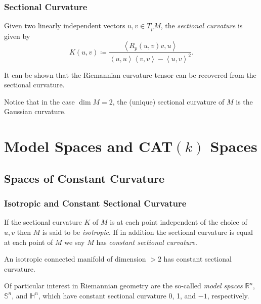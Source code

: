 \documentclass[handout]{beamer}
\newcommand{\Sp}{\mathbb{S}}
\newcommand{\Hy}{\mathbb{H}}
\newcommand{\R}{\mathbb{R}}
\newcommand{\inprod}[2]{\left\langle #1, #2 \right\rangle}
\theoremstyle{definition}
\begin{document}
\begin{frame}
    \frametitle{Sectional Curvature}

    \pause
    \begin{definition}
        Given two linearly independent vectors $u, v \in T_pM$, the \emph{sectional curvature}
        is given by
        \[
            K(u,v) \coloneqq \frac{\inprod{R_p(u,v)v}{u}}{\inprod{u}{u}\inprod{v}{v} - \inprod{u}{v}^2}.
        \]
    \end{definition}

    \pause
    It can be shown that the Riemannian curvature tensor can be recovered from the
    sectional curvature.

    \pause
    Notice that in the case $\dim M = 2$, the (unique) sectional curvature of $M$ is the
    Gaussian curvature.

\end{frame}

\section{Model Spaces and CAT$(k)$ Spaces}

\subsection{Spaces of Constant Curvature}

\begin{frame}
    \frametitle{Isotropic and Constant Sectional Curvature}

    \pause
    \begin{definition}
        If the sectional curvature $K$ of $M$ is at each point independent of the
        choice of $u,v$ then $M$ is said to be \emph{isotropic}. If in addition
        the sectional curvature is equal at each point of $M$ we say $M$ has
        \emph{constant sectional curvature}.
    \end{definition}

    \pause
    \begin{lemma}
        An isotropic connected manifold of dimension $> 2$ has constant sectional curvature.
    \end{lemma}

    \pause
    Of particular interest in Riemannian geometry are the so-called
    \emph{model spaces} $\R^n$, $\Sp^n$, and $\Hy^n$, which have constant
    sectional curvature 0, 1, and $-1$, respectively.

\end{frame}
\end{document}
